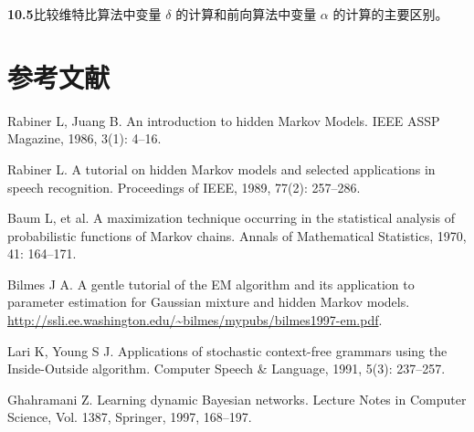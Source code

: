 \documentclass[UTF8,12pt,a4paper,fontset=fandol]{ctexart}
\begin{document}
\noindent\textbf{10.5}\quad 比较维特比算法中变量 $\delta$ 的计算和前向算法中变量 $\alpha$ 的计算的主要区别。

\section*{参考文献}

\noindent [1] Rabiner L, Juang B. An introduction to hidden Markov Models. IEEE ASSP Magazine, 1986, 3(1): 4--16.

\noindent [2] Rabiner L. A tutorial on hidden Markov models and selected applications in speech recognition. Proceedings of IEEE, 1989, 77(2): 257--286.

\noindent [3] Baum L, et al. A maximization technique occurring in the statistical analysis of probabilistic functions of Markov chains. Annals of Mathematical Statistics, 1970, 41: 164--171.

\noindent [4] Bilmes J A. A gentle tutorial of the EM algorithm and its application to parameter estimation for Gaussian mixture and hidden Markov models. \url{http://ssli.ee.washington.edu/~bilmes/mypubs/bilmes1997-em.pdf}.

\noindent [5] Lari K, Young S J. Applications of stochastic context-free grammars using the Inside-Outside algorithm. Computer Speech \& Language, 1991, 5(3): 237--257.

\noindent [6] Ghahramani Z. Learning dynamic Bayesian networks. Lecture Notes in Computer Science, Vol. 1387, Springer, 1997, 168--197.
\end{document}
